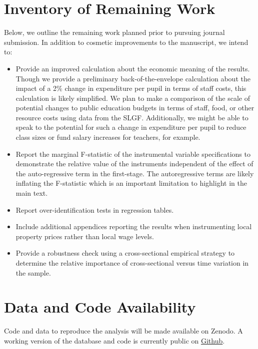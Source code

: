 \documentclass[
  10pt,
]{article}
\providecommand{\tightlist}{%
  \setlength{\itemsep}{0pt}\setlength{\parskip}{0pt}}
\begin{document}
\section{Inventory of Remaining Work}\label{inventory-of-remaining-work}

Below, we outline the remaining work planned prior to pursuing journal
submission. In addition to cosmetic improvements to the manuscript, we
intend to:

\begin{itemize}
\tightlist
\item
  Provide an improved calculation about the economic meaning of the
  results. Though we provide a preliminary back-of-the-envelope
  calculation about the impact of a 2\% change in expenditure per pupil
  in terms of staff costs, this calculation is likely simplified. We
  plan to make a comparison of the scale of potential changes to public
  education budgets in terms of staff, food, or other resource costs
  using data from the SLGF. Additionally, we might be able to speak to
  the potential for such a change in expenditure per pupil to reduce
  class sizes or fund salary increases for teachers, for example.
\item
  Report the marginal F-statistic of the instrumental variable
  specifications to demonstrate the relative value of the instruments
  independent of the effect of the auto-regressive term in the
  first-stage. The autoregressive terms are likely inflating the
  F-statistic which is an important limitation to highlight in the main
  text.
\item
  Report over-identification tests in regression tables.
\item
  Include additional appendices reporting the results when instrumenting
  local property prices rather than local wage levels.
\item
  Provide a robustness check using a cross-sectional empirical strategy
  to determine the relative importance of cross-sectional versus time
  variation in the sample.
\end{itemize}

\section{Data and Code Availability}\label{data-and-code-availability}

Code and data to reproduce the analysis will be made available on
Zenodo. A working version of the database and code is currently public
on \href{https://github.com/ebbam/pub_fin_schools}{Github}.
\end{document}
